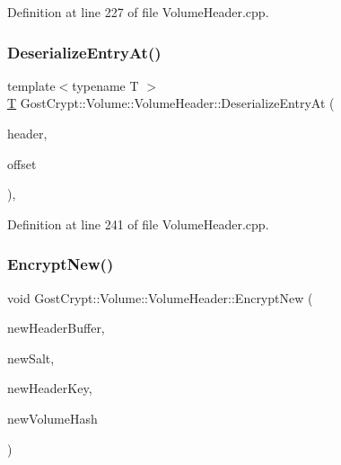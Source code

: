 Definition at line 227 of file Volume\+Header.\+cpp.

\mbox{\label{class_gost_crypt_1_1_volume_1_1_volume_header_a7698d95b13fc25bb977069309742844a}} 
\subsubsection{\texorpdfstring{Deserialize\+Entry\+At()}{DeserializeEntryAt()}}
{\footnotesize\ttfamily template$<$typename T $>$ \\
\hyperlink{_stribog_8c_aba2f4c400d7a4c0bf0296be622087314}{T} Gost\+Crypt\+::\+Volume\+::\+Volume\+Header\+::\+Deserialize\+Entry\+At (\begin{DoxyParamCaption}\item[{const \hyperlink{class_gost_crypt_1_1_buffer_ptr}{Buffer\+Ptr} \&}]{header,  }\item[{const size\+\_\+t \&}]{offset }\end{DoxyParamCaption})\hspace{0.3cm}{\ttfamily [static]}, {\ttfamily [protected]}}



Definition at line 241 of file Volume\+Header.\+cpp.

\mbox{\label{class_gost_crypt_1_1_volume_1_1_volume_header_a1c2ed40301cf445862f0f53f46d2cf4e}} 
\subsubsection{\texorpdfstring{Encrypt\+New()}{EncryptNew()}}
{\footnotesize\ttfamily void Gost\+Crypt\+::\+Volume\+::\+Volume\+Header\+::\+Encrypt\+New (\begin{DoxyParamCaption}\item[{\hyperlink{class_gost_crypt_1_1_buffer_ptr}{Buffer\+Ptr} \&}]{new\+Header\+Buffer,  }\item[{const \hyperlink{class_gost_crypt_1_1_buffer_ptr}{Buffer\+Ptr} \&}]{new\+Salt,  }\item[{const \hyperlink{class_gost_crypt_1_1_buffer_ptr}{Buffer\+Ptr} \&}]{new\+Header\+Key,  }\item[{Q\+Shared\+Pointer$<$ \hyperlink{class_gost_crypt_1_1_volume_1_1_volume_hash}{Volume\+Hash} $>$}]{new\+Volume\+Hash }\end{DoxyParamCaption})}



